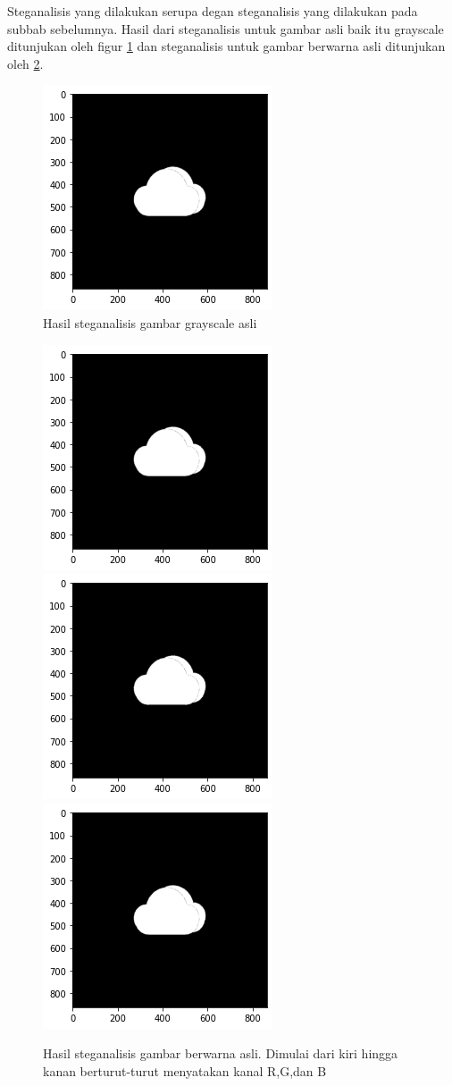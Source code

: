 \documentclass[10pt,conference]{IEEEtran}
\theoremstyle{definition}
\begin{document}
Steganalisis yang dilakukan serupa degan steganalisis yang dilakukan pada subbab sebelumnya. Hasil dari steganalisis untuk gambar asli baik itu grayscale ditunjukan oleh figur \ref{fig:stegoribw} dan steganalisis untuk gambar 
berwarna asli ditunjukan oleh \ref{fig:stegoriwarna}.

\begin{figure}
    \centerline{
        \includegraphics[width=0.5\columnwidth]{steganalisis-original-bw.png}
    }
    \caption{Hasil steganalisis gambar grayscale asli}
    \label{fig:stegoribw} 
\end{figure}

\begin{figure}
    \centerline{
        \includegraphics[width=0.3\columnwidth]{steg-warna-asli-r.png}
        \includegraphics[width=0.3\columnwidth]{steg-warna-asli-g.png}
        \includegraphics[width=0.3\columnwidth]{steg-warna-asli-b.png}
    }
    \caption{Hasil steganalisis gambar berwarna asli. Dimulai dari kiri hingga kanan berturut-turut menyatakan kanal R,G,dan B}
    \label{fig:stegoriwarna} 
\end{figure}
\end{document}
